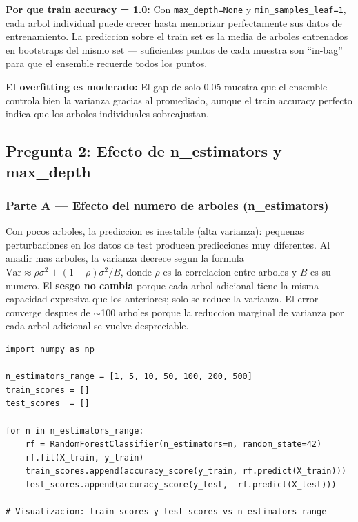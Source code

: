 \documentclass[12pt,a4paper]{article}
\begin{document}
\textbf{Por que train accuracy = 1.0:} Con \texttt{max\_depth=None} y
\texttt{min\_samples\_leaf=1}, cada arbol individual puede crecer hasta memorizar perfectamente
sus datos de entrenamiento. La prediccion sobre el train set es la media de arboles entrenados
en bootstraps del mismo set --- suficientes puntos de cada muestra son ``in-bag'' para que el
ensemble recuerde todos los puntos.

\textbf{El overfitting es moderado:} El gap de solo 0.05 muestra que el ensemble controla bien
la varianza gracias al promediado, aunque el train accuracy perfecto indica que los arboles
individuales sobreajustan.

\subsection{Pregunta 2: Efecto de n\_estimators y max\_depth}

\subsubsection*{Parte A --- Efecto del numero de arboles (n\_estimators)}

\begin{tcolorbox}[porquebox, title={Por que n\_estimators no causa overfitting?}]
Con pocos arboles, la prediccion es inestable (alta varianza): pequenas perturbaciones en los
datos de test producen predicciones muy diferentes. Al anadir mas arboles, la varianza decrece
segun la formula $\text{Var} \approx \rho\sigma^2 + (1-\rho)\sigma^2/B$, donde $\rho$ es la
correlacion entre arboles y $B$ es su numero. El \textbf{sesgo no cambia} porque cada arbol
adicional tiene la misma capacidad expresiva que los anteriores; solo se reduce la varianza.
El error converge despues de $\sim$100 arboles porque la reduccion marginal de varianza por
cada arbol adicional se vuelve despreciable.
\end{tcolorbox}

\begin{lstlisting}[caption={Analisis del efecto de n\_estimators}]
import numpy as np

n_estimators_range = [1, 5, 10, 50, 100, 200, 500]
train_scores = []
test_scores  = []

for n in n_estimators_range:
    rf = RandomForestClassifier(n_estimators=n, random_state=42)
    rf.fit(X_train, y_train)
    train_scores.append(accuracy_score(y_train, rf.predict(X_train)))
    test_scores.append(accuracy_score(y_test,  rf.predict(X_test)))

# Visualizacion: train_scores y test_scores vs n_estimators_range
\end{lstlisting}
\end{document}
